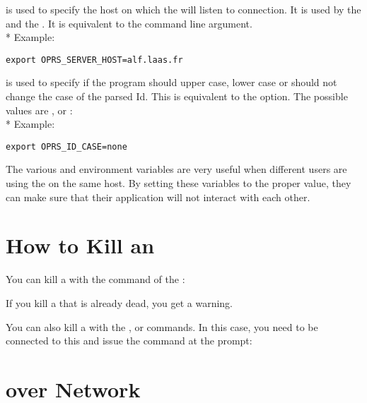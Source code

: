 \begin{description}
\item[\code{OPRS\_SERVER\_HOST}] is used to specify the host on which the
\OPRSS{} will listen to connection. It is used by the \CPK{} and the
\XPK{}. It is equivalent to the  command line argument.\\*
Example:
\begin{verbatim}
export OPRS_SERVER_HOST=alf.laas.fr
\end{verbatim}

\item[\code{OPRS\_ID\_CASE}] is used to specify if the program should upper case,
lower case or should not change the case of the parsed Id. This is equivalent
to the  option. The possible values
are ,  or :\\*
Example:
\begin{verbatim}
export OPRS_ID_CASE=none
\end{verbatim}

\end{description}

The various  and  environment variables are very
useful when different users are using the \COPRSDE{} on the same host. By setting
these variables to the proper value, they can make sure that their application
will not interact with each other.

\section{How to Kill an \CPK{}}

You can kill a \CPK{} with the  command of the
\OPRSS{}:


If you kill a \CPK{}that is already dead, you get a warning.

You can also kill a \CPK{} with the ,  or 
commands. In this case, you need to be connected to this \COPRS{} and issue the
command at the prompt:


\section{\CPK{} over Network}

